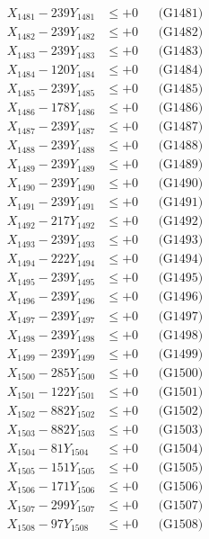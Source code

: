 \documentclass[a4paper,10pt]{article}
\begin{document}
{\begin{align}
\allowbreak
X_{1481} - 239Y_{1481} &\leq +0 && \text{(G1481)} \\
X_{1482} - 239Y_{1482} &\leq +0 && \text{(G1482)} \\
X_{1483} - 239Y_{1483} &\leq +0 && \text{(G1483)} \\
X_{1484} - 120Y_{1484} &\leq +0 && \text{(G1484)} \\
X_{1485} - 239Y_{1485} &\leq +0 && \text{(G1485)} \\
X_{1486} - 178Y_{1486} &\leq +0 && \text{(G1486)} \\
X_{1487} - 239Y_{1487} &\leq +0 && \text{(G1487)} \\
X_{1488} - 239Y_{1488} &\leq +0 && \text{(G1488)} \\
X_{1489} - 239Y_{1489} &\leq +0 && \text{(G1489)} \\
X_{1490} - 239Y_{1490} &\leq +0 && \text{(G1490)} \\
\allowbreak
X_{1491} - 239Y_{1491} &\leq +0 && \text{(G1491)} \\
X_{1492} - 217Y_{1492} &\leq +0 && \text{(G1492)} \\
X_{1493} - 239Y_{1493} &\leq +0 && \text{(G1493)} \\
X_{1494} - 222Y_{1494} &\leq +0 && \text{(G1494)} \\
X_{1495} - 239Y_{1495} &\leq +0 && \text{(G1495)} \\
X_{1496} - 239Y_{1496} &\leq +0 && \text{(G1496)} \\
X_{1497} - 239Y_{1497} &\leq +0 && \text{(G1497)} \\
X_{1498} - 239Y_{1498} &\leq +0 && \text{(G1498)} \\
X_{1499} - 239Y_{1499} &\leq +0 && \text{(G1499)} \\
X_{1500} - 285Y_{1500} &\leq +0 && \text{(G1500)} \\
\allowbreak
X_{1501} - 122Y_{1501} &\leq +0 && \text{(G1501)} \\
X_{1502} - 882Y_{1502} &\leq +0 && \text{(G1502)} \\
X_{1503} - 882Y_{1503} &\leq +0 && \text{(G1503)} \\
X_{1504} - 81Y_{1504} &\leq +0 && \text{(G1504)} \\
X_{1505} - 151Y_{1505} &\leq +0 && \text{(G1505)} \\
X_{1506} - 171Y_{1506} &\leq +0 && \text{(G1506)} \\
X_{1507} - 299Y_{1507} &\leq +0 && \text{(G1507)} \\
X_{1508} - 97Y_{1508} &\leq +0 && \text{(G1508)} \\

\end{align}}
\end{document}
